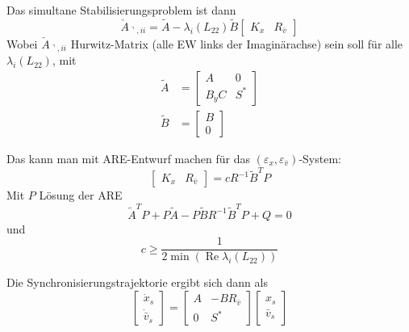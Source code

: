 Das simultane Stabilisierungsproblem ist dann
\begin{equation}
    \check{A}_{\urcorner, ii} = \tilde{A} - \lambda_i(L_{22}) \tilde{B} \begin{bmatrix}
        K_x & R_{\bar{v}}
    \end{bmatrix}
\end{equation}
Wobei $\check{A}_{\urcorner, ii}$ Hurwitz-Matrix (alle EW links der Imaginärachse)
sein soll für alle $\lambda_i(L_{22})$, mit
\begin{align}
    \tilde{A} &= \begin{bmatrix}
        A & 0 \\
        B_y C & S^*
    \end{bmatrix} \\
    \tilde{B} &= \begin{bmatrix}
        B \\ 0
    \end{bmatrix}
\end{align}

Das kann man mit ARE-Entwurf machen für das $(\varepsilon_x, \varepsilon_{\bar{v}})$-System:
\begin{equation}
    \boxed{
    \begin{bmatrix}
        K_x & R_{\bar{v}}
    \end{bmatrix}
    = cR^{-1}\tilde{B}^TP
    }
\end{equation}
Mit $P$ Lösung der ARE
\begin{equation}
    \tilde{A}^TP + P\tilde{A}-P\tilde{B}R^{-1}\tilde{B}^TP+Q = 0
\end{equation}
und
\begin{equation}
    c \geq \frac{1}{2 \min (\operatorname{Re} \lambda_i(L_{22}))}
\end{equation}


Die Synchronisierungstrajektorie ergibt sich dann als
\begin{equation}
    \begin{bmatrix}
        \dot{x}_s \\ \dot{\bar{v}}_s
    \end{bmatrix}
    =
    \begin{bmatrix}
        A & -BR_{\bar{v}} \\
        0 & S^*
    \end{bmatrix}
    \begin{bmatrix}
        x_s \\ \bar{v}_s
    \end{bmatrix}
\end{equation}


